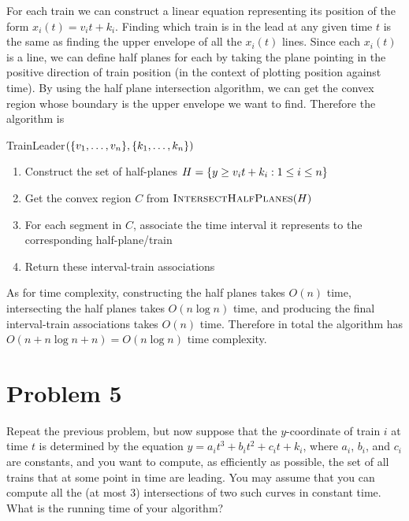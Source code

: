 \documentclass[12pt]{extarticle}
\begin{document}
\begin{solution}
    For each train we can construct a linear equation representing its position of the form $x_i(t) = v_i t + k_i$. Finding which train is in the lead at any given time $t$ is the same as finding the upper envelope of all the $x_i(t)$ lines. Since each $x_i(t)$ is a line, we can define half planes for each by taking the plane pointing in the positive direction of train position (in the context of plotting position against time). By using the half plane intersection algorithm, we can get the convex region whose boundary is the upper envelope we want to find. Therefore the algorithm is
    \begin{algorithm}[H]
        \caption{TrainLeader$(\qty{v_1, \ldots, v_n}, \qty{k_1, \ldots, k_n})$}
        \begin{enumerate}
            \item Construct the set of half-planes $H = \qty{ y \geq v_i t + k_i : 1 \leq i \leq n }$
            \item Get the convex region $C$ from $\textsc{IntersectHalfPlanes}(H)$
            \item For each segment in $C$, associate the time interval it represents to the corresponding half-plane/train
            \item Return these interval-train associations
        \end{enumerate}
    \end{algorithm}
    As for time complexity, constructing the half planes takes $O(n)$ time, intersecting the half planes takes $O(n \log n)$ time, and producing the final interval-train associations takes $O(n)$ time. Therefore in total the algorithm has $O(n + n \log n + n) = O(n \log n)$ time complexity.
\end{solution}

\section*{Problem 5}
Repeat the previous problem, but now suppose that the $y$-coordinate of train $i$ at time $t$ is determined by the equation $y = a_i t^3 + b_i t^2 + c_i t + k_i$, where $a_i$, $b_i$, and $c_i$ are constants, and you want to compute, as efficiently as possible, the set of all trains that at some point in time are leading. You may assume that you can compute all the (at most 3) intersections of two such curves in constant time. What is the running time of your algorithm?
\end{document}
